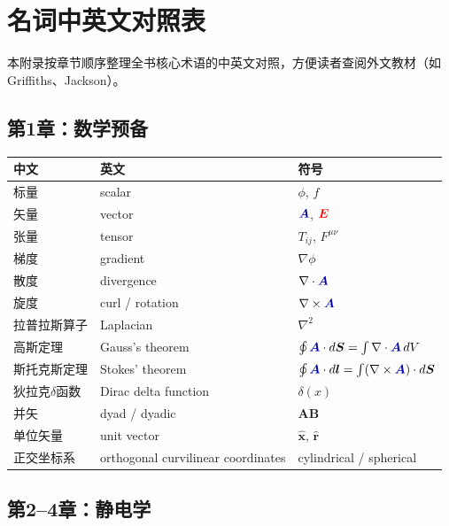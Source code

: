 \documentclass[11pt,a4paper,openany,oneside]{book}
\newcommand{\vecE}{\textcolor{red}{\vect{E}}}
\newcommand{\vecA}{\textcolor{blue!70!black}{\vect{A}}}
\newcommand{\vect}[1]{\bm{#1}}
\newcommand{\unitvec}[1]{\hat{\vect{#1}}}
\newcommand{\grad}{\nabla}
\newcommand{\curl}{\nabla\times}
\newcommand{\divg}{\nabla\cdot}
\newcommand{\lap}{\nabla^2}
\begin{document}
\chapter{名词中英文对照表}

本附录按章节顺序整理全书核心术语的中英文对照，方便读者查阅外文教材（如 Griffiths、Jackson）。

\section{第1章：数学预备}

\begin{center}
\begin{tabular}{@{}lll@{}}
\toprule
\textbf{中文} & \textbf{英文} & \textbf{符号} \\
\midrule
标量 & scalar & $\phi$, $f$ \\
矢量 & vector & $\vecA$, $\vecE$ \\
张量 & tensor & $T_{ij}$, $F^{\mu\nu}$ \\
梯度 & gradient & $\grad\phi$ \\
散度 & divergence & $\divg\vecA$ \\
旋度 & curl / rotation & $\curl\vecA$ \\
拉普拉斯算子 & Laplacian & $\lap$ \\
高斯定理 & Gauss's theorem & $\oint\vecA\cdot d\vect{S}=\int\divg\vecA\,dV$ \\
斯托克斯定理 & Stokes' theorem & $\oint\vecA\cdot d\vect{l}=\int(\curl\vecA)\cdot d\vect{S}$ \\
狄拉克$\delta$函数 & Dirac delta function & $\delta(x)$ \\
并矢 & dyad / dyadic & $\bm{A}\bm{B}$ \\
单位矢量 & unit vector & $\unitvec{x}$, $\unitvec{r}$ \\
正交坐标系 & orthogonal curvilinear coordinates & cylindrical / spherical \\
\bottomrule
\end{tabular}
\end{center}

\section{第2--4章：静电学}
\end{document}
